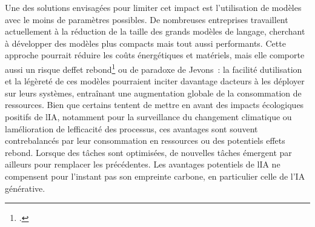 	Une des solutions envisagées pour limiter cet impact
	est l'utilisation de modèles avec le moins de paramètres possibles. De
	nombreuses entreprises travaillent actuellement à la réduction de la
	taille des grands modèles de langage, cherchant à développer des modèles
	plus compacts mais tout aussi performants. Cette approche pourrait
	réduire les coûts énergétiques et matériels, mais elle comporte aussi un
	risque d\textquotesingle effet rebond\footcite{guillory_impacts_2024} ou de paradoxe de Jevons~: 
	la facilité d\textquotesingle utilisation et la légèreté de ces
	modèles pourraient inciter davantage d\textquotesingle acteurs à les
	déployer sur leurs systèmes, entraînant une augmentation globale de la
	consommation de ressources. Bien que certains tentent de 
	mettre en avant des impacts écologiques positifs
	de l\textquotesingle IA, notamment pour la surveillance du changement
	climatique ou l\textquotesingle amélioration de
	l\textquotesingle efficacité des processus, ces avantages sont souvent
	contrebalancés par leur consommation en ressources ou des potentiels effets rebond. Lorsque des
	tâches sont optimisées, de nouvelles tâches émergent par ailleurs pour remplacer les
	précédentes. Les avantages potentiels de l\textquotesingle IA ne
	compensent pour l'instant pas son empreinte carbone, en particulier celle de l'IA générative.
	
